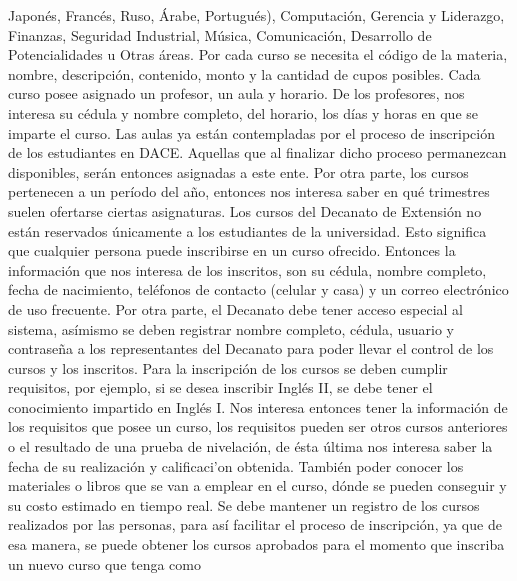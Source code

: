\documentclass[12pt,a4paper,spanish]{article}
\begin{document}
Japon\'es, Franc\'es, Ruso, \'Arabe, Portugu\'es), Computaci\'on,
Gerencia y Liderazgo, Finanzas, Seguridad Industrial, M\'usica,
Comunicaci\'on, Desarrollo de Potencialidades u Otras \'areas. Por
cada curso se necesita el c\'odigo de la materia, nombre,
descripci\'on, contenido, monto y la cantidad de cupos posibles. Cada
curso posee asignado un profesor, un aula y horario. De los
profesores, nos interesa su c\'edula y nombre completo, del horario,
los d\'ias y horas en que se imparte el curso. Las aulas ya est\'an
contempladas por el proceso de inscripci\'on de los estudiantes en
DACE. Aquellas que al finalizar dicho proceso permanezcan disponibles,
ser\'an entonces asignadas a este ente. Por otra parte, los cursos
pertenecen a un per\'iodo del a\~no, entonces nos interesa saber en
qu\'e trimestres suelen ofertarse ciertas asignaturas. 
\newline
\newline
\indent Los cursos del Decanato de Extensi\'on no est\'an reservados
\'unicamente a los estudiantes de la universidad. Esto significa que
cualquier persona puede inscribirse en un curso ofrecido. Entonces 
la informaci\'on que nos interesa de los inscritos, son su
c\'edula, nombre completo, fecha de nacimiento, tel\'efonos de
contacto (celular y casa) y un correo electr\'onico de uso
frecuente. Por otra parte, el Decanato debe tener acceso especial
al sistema, as\'imismo se deben registrar nombre completo, c\'edula, 
usuario y contrase\~na a los representantes del Decanato para poder llevar 
el control de los cursos y los inscritos.
\newline
\newline
\indent Para la inscripci\'on de los cursos se deben cumplir
requisitos, por ejemplo, si se desea inscribir Ingl\'es II, se debe
tener el conocimiento impartido en Ingl\'es I. Nos interesa entonces
tener la informaci\'on de los requisitos que posee un curso, los
requisitos pueden ser otros cursos anteriores o el resultado de una
prueba de nivelaci\'on, de \'esta \'ultima nos interesa saber la fecha
de su realizaci\'on y calificaci'on obtenida. Tambi\'en poder
conocer los materiales o libros que se van a emplear en el curso,
d\'onde se pueden conseguir y su costo estimado en tiempo real. 
\newline
\newline
\indent Se debe mantener un registro de los cursos
realizados por las personas, para as\'i facilitar el proceso de
inscripci\'on, ya que de esa manera, se puede obtener los cursos
aprobados para el momento que inscriba un nuevo curso que tenga como
\end{document}
